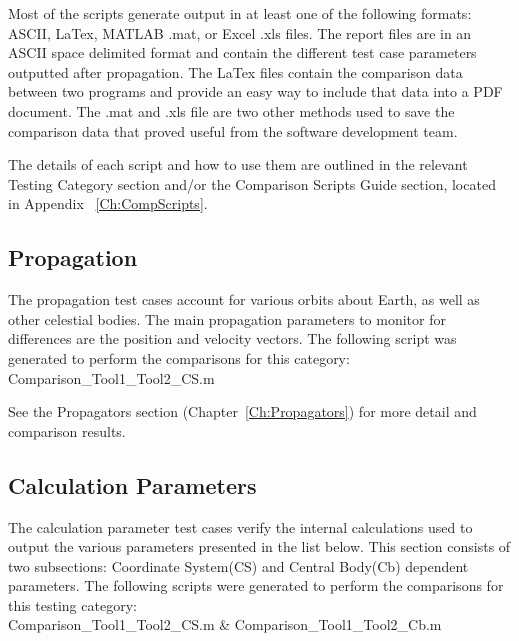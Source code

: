 Most of the scripts generate output in at least one of the following
formats: ASCII, LaTex, MATLAB .mat, or
Excel .xls files. The report files are in an ASCII space delimited
format and contain the different test case parameters outputted
after propagation. The LaTex files contain the
comparison data between two programs and provide an easy way to
include that data into a PDF document. The .mat and .xls file are
two other methods used to save the comparison data that proved
useful from the software development team.

The details of each script and how to use them are outlined in the
relevant Testing Category section and/or the Comparison Scripts
Guide section, located in Appendix ~\ref{Ch:CompScripts}.

\subsection{Propagation}
The propagation test cases account for various orbits about Earth,
as well as other celestial bodies. The main propagation parameters
to monitor for differences are the position and velocity vectors.
The following script was generated to perform the
comparisons for this category:\\
Comparison\_Tool1\_Tool2\_CS.m

See the Propagators section (Chapter~\ref{Ch:Propagators}) for more
detail and comparison results.\\

\subsection{Calculation Parameters}
The calculation parameter test cases verify the internal
calculations used to output the various parameters presented in the
list below. This section consists of two subsections: Coordinate
System(CS) and Central Body(Cb) dependent
parameters. The following scripts
were generated to perform the comparisons for this testing category: \\
Comparison\_Tool1\_Tool2\_CS.m \& Comparison\_Tool1\_Tool2\_Cb.m\\

